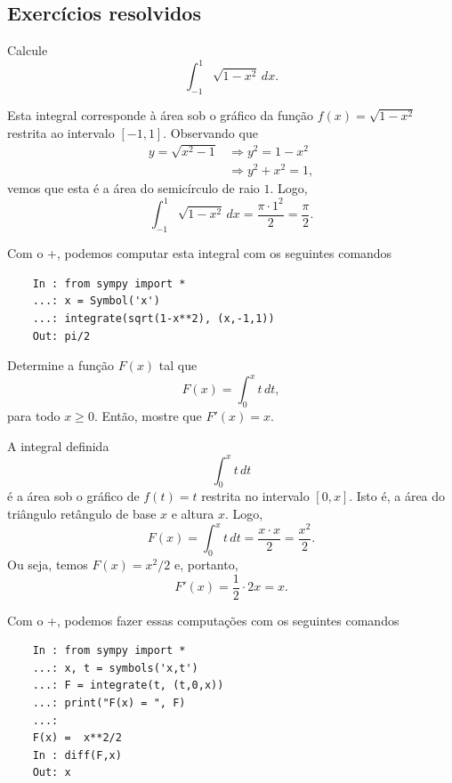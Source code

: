 \subsection*{Exercícios resolvidos}

\begin{exeresol}
  Calcule
  \begin{equation}
    \int_{-1}^1 \sqrt{1 - x^2}\,dx.
  \end{equation}
\end{exeresol}
\begin{resol}
  Esta integral corresponde à área sob o gráfico da função $f(x) = \sqrt{1 - x^2}$ restrita ao intervalo $[-1, 1]$. Observando que
  \begin{align}
    y = \sqrt{x^2 - 1} &\Rightarrow y^2 = 1 - x^2\\
                       &\Rightarrow y^2 + x^2 = 1,
  \end{align}
  vemos que esta é a área do semicírculo de raio $1$. Logo,
  \begin{equation}
    \int_{-1}^1 \sqrt{1 - x^2}\,dx = \frac{\pi \cdot 1^2}{2} = \frac{\pi}{2}.
  \end{equation}

  \ifispython
  Com o {\python}+{\sympy}, podemos computar esta integral com os seguintes comandos
  \begin{lstlisting}
    In : from sympy import *
    ...: x = Symbol('x')
    ...: integrate(sqrt(1-x**2), (x,-1,1))
    Out: pi/2
  \end{lstlisting}
  \fi
\end{resol}

\begin{exeresol}
  Determine a função $F(x)$ tal que
  \begin{equation}
    F(x) = \int_0^x t\,dt,
  \end{equation}
  para todo $x\geq 0$. Então, mostre que $F'(x) = x$.
\end{exeresol}
\begin{resol}
  A integral definida
  \begin{equation}
    \int_0^x t\,dt
  \end{equation}
  é a área sob o gráfico de $f(t) = t$ restrita no intervalo $[0, x]$. Isto é, a área do triângulo retângulo de base $x$ e altura $x$. Logo,
  \begin{equation}
    F(x) = \int_0^x t\,dt = \frac{x\cdot x}{2} = \frac{x^2}{2}.
  \end{equation}
  Ou seja, temos $F(x) = x^2/2$ e, portanto,
  \begin{equation}
    F'(x) = \frac{1}{2}\cdot 2x = x.
  \end{equation}

  \ifispython
  Com o {\python}+{\sympy}, podemos fazer essas computações com os seguintes comandos
  \begin{lstlisting}
    In : from sympy import *
    ...: x, t = symbols('x,t')
    ...: F = integrate(t, (t,0,x))
    ...: print("F(x) = ", F)
    ...: 
    F(x) =  x**2/2
    In : diff(F,x)
    Out: x
  \end{lstlisting}
  \fi  
\end{resol}

